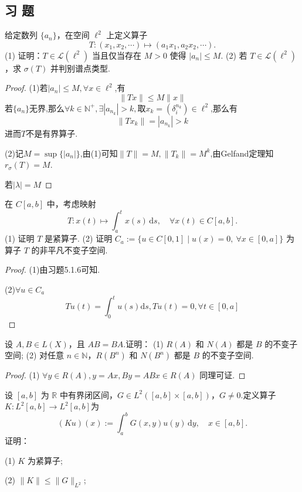 \documentclass[lang=cn,newtx,10pt,scheme=chinese,thmcnt=chapter]{elegantbook}
\newcommand{\dif}{\mathrm{d}}
\begin{document}
\subsection{习 题}
\begin{problemset}
  \item 给定数列 \(\{a_n\}\)，在空间 \({\ell }^{2}\) 上定义算子
  \[
  T : (x_{1},x_{2},\cdots) \mapsto (a_{1}x_{1},a_{2}x_{2},\cdots).
  \]
  (1) 证明：\(T \in  \mathcal{L}\left( {\ell }^{2}\right)\) 当且仅当存在 \(M > 0\) 使得 \(|a_n| \leqslant M\).  
  (2) 若 \(T \in  \mathcal{L}\left( {\ell }^{2}\right)\)，求 \(\sigma(T)\) 并判别谱点类型.
\begin{proof}
    (1)若$|a_n|\leqslant M,\forall x\in \ell^2$,有\[
    \|Tx\|\leqslant M\|x\|
    \]
    若$\{a_n\}$无界,那么$\forall k\in \mathbb{N}^+,\exists |a_{n_k}|>k,取x_k=(\delta_i^{n_k})\in \ell^2$,那么有\[ 
    \|Tx_k\|=|a_{n_k}|>k\]
    进而$T$不是有界算子.
    
    (2)记$M=\sup\{|a_n|\}$,由(1)可知$\|T\|=M,\|T_k\|=M^k$,由Gelfand定理知$r_\sigma(T)=M$.

    若$|\lambda|=M$
\end{proof}
  \item 在 \(C[a,b]\) 中，考虑映射
  \[
  T : x(t) \mapsto \int_{a}^{t}x(s)\,\dif s,\quad \forall x(t) \in C[a,b].
  \]
  (1) 证明 \(T\) 是紧算子.  
  (2) 证明 \({C}_{a} := \{u \in C[0,1] \mid u(x) = 0,\ \forall x \in [0,a]\}\) 为算子 \(T\) 的非平凡不变子空间.
\begin{proof}
    (1)由习题5.1.6可知.

    (2)$\forall  u\in C_a$
    \[
    Tu(t)=\int_0^t u(s)\dif s,Tu(t)=0,\forall t\in [0,a]
    \]
    
\end{proof}
  \item 设 \(A,B \in L(X)\)，且 \(AB = BA\).证明：  
  (1) \(R(A)\) 和 \(N(A)\) 都是 \(B\) 的不变子空间;  
  (2) 对任意 \(n \in \mathbb{N}\)，\(R(B^{n})\) 和 \(N(B^{n})\) 都是 \(B\) 的不变子空间.
\begin{proof}
    (1) $\forall y\in R(A),y=Ax,By=ABx\in R(A)$
    同理可证.
\end{proof}
  \item 设 \([a,b]\) 为 \(\mathbb{R}\) 中有界闭区间，\(G \in L^{2}([a,b]\times[a,b])\)，\(G \neq 0\).定义算子$K: L^2[a,b]\to L^2[a,b]$为
  \[
  (Ku)(x) := \int_{a}^{b} G(x,y)u(y)\,\dif y,\quad x \in [a,b].
  \]
  证明：  
  
  (1) \(K\) 为紧算子;  
  
  (2) \(\|K\| \le \|G\|_{L^{2}}\);  
  

\end{problemset}
\end{document}

